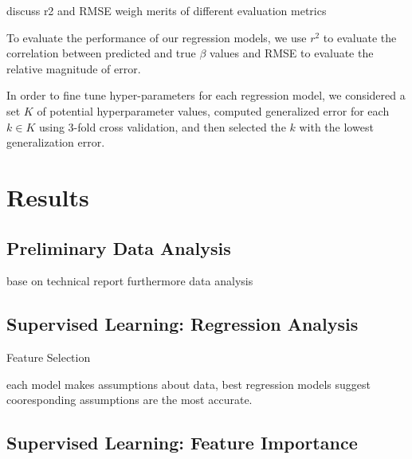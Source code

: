 \documentclass{article} %
\begin{document}

	discuss r2 and RMSE
	weigh merits of different evaluation metrics

To evaluate the performance of our regression models, we use $r^2$ to evaluate the correlation between predicted and true $\beta$ values and RMSE to evaluate the relative magnitude of error.

    In order to fine tune hyper-parameters for each regression model, we considered a set $K$ of potential hyperparameter values, computed generalized error for each $k \in K$ using 3-fold cross validation, and then selected the $k$ with the lowest generalization error.  
    
\section{Results}

\subsection{Preliminary Data Analysis}
	base on technical report
	furthermore data analysis

\subsection{Supervised Learning: Regression Analysis}
	Feature Selection
	
	each model makes assumptions about data, best regression models suggest cooresponding assumptions are the most accurate.
	
\subsection{Supervised Learning: Feature Importance}
\end{document}
